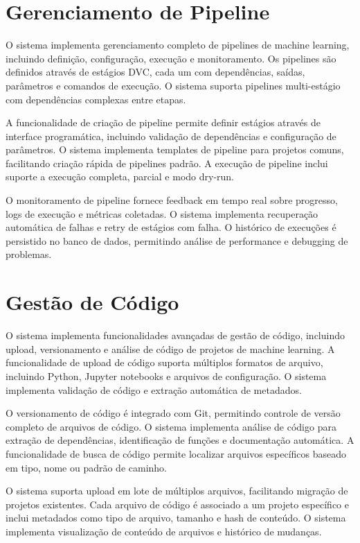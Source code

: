 \documentclass[12pt,a4paper]{article}
\begin{document}
\section{Gerenciamento de Pipeline}

O sistema implementa gerenciamento completo de pipelines de machine learning, incluindo definição, configuração, execução e monitoramento. Os pipelines são definidos através de estágios DVC, cada um com dependências, saídas, parâmetros e comandos de execução. O sistema suporta pipelines multi-estágio com dependências complexas entre etapas.

A funcionalidade de criação de pipeline permite definir estágios através de interface programática, incluindo validação de dependências e configuração de parâmetros. O sistema implementa templates de pipeline para projetos comuns, facilitando criação rápida de pipelines padrão. A execução de pipeline inclui suporte a execução completa, parcial e modo dry-run.

O monitoramento de pipeline fornece feedback em tempo real sobre progresso, logs de execução e métricas coletadas. O sistema implementa recuperação automática de falhas e retry de estágios com falha. O histórico de execuções é persistido no banco de dados, permitindo análise de performance e debugging de problemas.

\section{Gestão de Código}

O sistema implementa funcionalidades avançadas de gestão de código, incluindo upload, versionamento e análise de código de projetos de machine learning. A funcionalidade de upload de código suporta múltiplos formatos de arquivo, incluindo Python, Jupyter notebooks e arquivos de configuração. O sistema implementa validação de código e extração automática de metadados.

O versionamento de código é integrado com Git, permitindo controle de versão completo de arquivos de código. O sistema implementa análise de código para extração de dependências, identificação de funções e documentação automática. A funcionalidade de busca de código permite localizar arquivos específicos baseado em tipo, nome ou padrão de caminho.

O sistema suporta upload em lote de múltiplos arquivos, facilitando migração de projetos existentes. Cada arquivo de código é associado a um projeto específico e inclui metadados como tipo de arquivo, tamanho e hash de conteúdo. O sistema implementa visualização de conteúdo de arquivos e histórico de mudanças.
\end{document}
